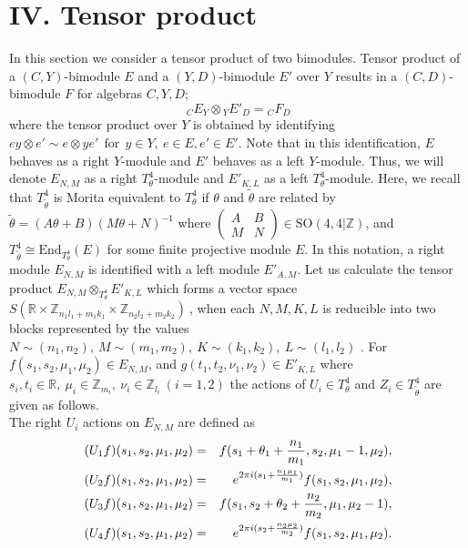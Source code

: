 \documentclass[12pt, a4paper]{article}
\newcommand{\Z}{{\mathbb Z}}
\newcommand{\R}{{\mathbb R}}
\begin{document}
%
\section*{IV. Tensor product}

In this section we consider a tensor product of two bimodules.
Tensor product of a $(C,Y)$-bimodule $E$ and a $(Y,D)$-bimodule
$E'$ over $Y$ results in a $(C,D)$-bimodule $F$ for algebras
$C,Y,D$;
\[ {}_CE_Y \otimes {}_Y E'_{D} = {}_CF_D \]
where the tensor product over $Y$ is obtained by identifying $ ey
\otimes e' \sim e \otimes y e'  \ \ \text{for} \ \ y \in Y, \ e
\in E , e' \in E' $. Note that in this identification, $E$ behaves
as a right $Y$-module and $E'$ behaves as a left $Y$-module. Thus,
we will denote $E_{N,M}$ as a right $T_\theta^4$-module and
$E'_{K,L}$ as a left $T_{\theta}^4$-module. Here, we recall that
$T^4_{\tilde{\theta}}$ is Morita equivalent to $T^4_\theta$ if
$\theta$ and $\tilde{\theta}$ are related by
$\tilde{\theta}=(A\theta+B)(M\theta+N)^{-1}$ where $\left(
\begin{array}{cc} A&B\\M&N \end{array} \right) \in \text{
SO}(4,4|{\Z})$, and
  $T^4_{\tilde{\theta}}  \cong \text{End}_{T^4_\theta}(E)$ for
some finite projective module $E$. In this notation, a right
module $E_{N,M}$ is identified with a left module $E'_{A,M}$. Let
us calculate the tensor product $E_{N,M} \otimes_{T^4_\theta}
E'_{K,L} $ which forms a vector space $S( \R \times
\Z_{n_1l_1+m_1k_1} \times \Z_{n_2l_2+m_2k_2} ) \ $, when each
$N,M,K,L$ is reducible into two blocks represented by the values
$N \sim (n_1,n_2), \ M \sim (m_1,m_2), \ K \sim (k_1,k_2), \ L
\sim (l_1,l_2)$ \cite{kkl01}. For $f(s_1,s_2,\mu_1, \mu_2) \in
E_{N,M}$, and $g(t_1,t_2,\nu_1,\nu_2) \in E'_{K,L} $ where
$s_i,t_i \in \R, \ \mu_i \in \Z_{m_i}, \ \nu_i \in \Z_{l_i} \
(i=1,2) $ the actions of $U_i \in T^4_\theta$ and $Z_i \in
T^4_{\tilde{\theta}}$ are given as follows. \\
The right $U_i$ actions on $E_{N,M}$ are defined as
\begin{eqnarray} \label{URactions}
(U_1f)(s_1,s_2,\mu_1,\mu_2)&=&
                 f(s_1  + \theta_1 + \frac{n_1}{m_1},s_2,\mu_1-1,\mu_2), \notag \\
(U_2f)(s_1,s_2,\mu_1,\mu_2)&=& e^{2\pi i(s_1 + \frac{n_1
  \mu_1}{m_1} )}   f(s_1,s_2,\mu_1,\mu_2), \notag \\
(U_3f)(s_1,s_2,\mu_1,\mu_2)&=&
                 f(s_1,s_2 + \theta_2 + \frac{n_2}{m_2},\mu_1,\mu_2-1), \notag \\
(U_4f)(s_1,s_2,\mu_1,\mu_2)&=& e^{2\pi i(s_2 + \frac{n_2
             \mu_2}{m_2} )}  f(s_1,s_2,\mu_1,\mu_2) .
\end{eqnarray}
\end{document}
